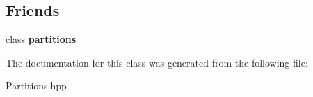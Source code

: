 \subsection*{Friends}
\begin{DoxyCompactItemize}
\item 
\hypertarget{classdis_1_1partitions_1_1iterator_a7dff1a2bd5787e50cf3e7f227e95e62b}{class {\bfseries partitions}}\label{classdis_1_1partitions_1_1iterator_a7dff1a2bd5787e50cf3e7f227e95e62b}

\end{DoxyCompactItemize}


The documentation for this class was generated from the following file\-:\begin{DoxyCompactItemize}
\item 
Partitions.\-hpp\end{DoxyCompactItemize}
